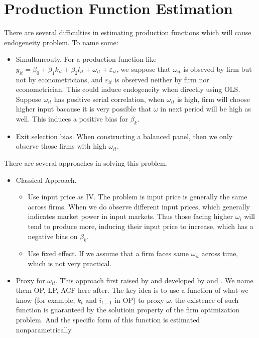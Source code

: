 \documentclass{book}
\theoremstyle{plain}
\theoremstyle{definition}
\begin{document}



\section{Production Function Estimation} %
\label{sec:production_function_estimation}

There are several difficulties in estimating production functions which will cause endogeneity problem. To name some:
\begin{itemize}
	\item Simultaneouty. For a production function like $y_{it}=\beta_0+\beta_1 k_{it}+\beta_2 l_{it} + \omega_{it}+\varepsilon_{it}$, we suppose that $\omega_{it}$ is obseved by firm but not by econometricians, and $\varepsilon_{it}$ is observed neither by firm nor econometrician. This could induce endogeneity when directly using OLS. Suppose $\omega_{it}$ has positive serial correlation, when $\omega_{it}$ is high, firm will choose higher input bacause it is very possible that $\omega$ in next period will be high as well. This induces a positive bias for $\beta_k$.
	\item Exit selection bias. When constructing a balanced panel, then we only observe those firms with high $\omega_{it}$.
\end{itemize}

There are several approaches in solving this problem.

\begin{itemize}
	\item Classical Approach.
	\begin{itemize}
		\item Use input price as IV. The problem is input price is generally the same across firms. When we do observe different input prices, which generally indicates market power in input markets. Thus those facing higher $\omega_i$ will tend to produce more, inducing their input price to increase, which has a negative bias on $\beta_k$.
		\item Use fixed effect. If we assume that a firm faces same $\omega_{it}$ across time, which is not very practical.
	\end{itemize}
	\item Proxy for $\omega_{it}$. This approach first raised by \cite{Olley:1996ef} and developed by \cite{Levinsohn:2003ej} and \cite{Ackerberg:2015ha}. We name them OP, LP, ACF here after. The key idea is to use a function of what we know (for example, $k_t$ and $i_{t-1}$ in OP) to proxy $\omega$, the existence of such function is guaranteed by the solutioin property of the firm optimization problem. And the specific form of this function is estimated nonparametrically.
\end{itemize}
\end{document}
